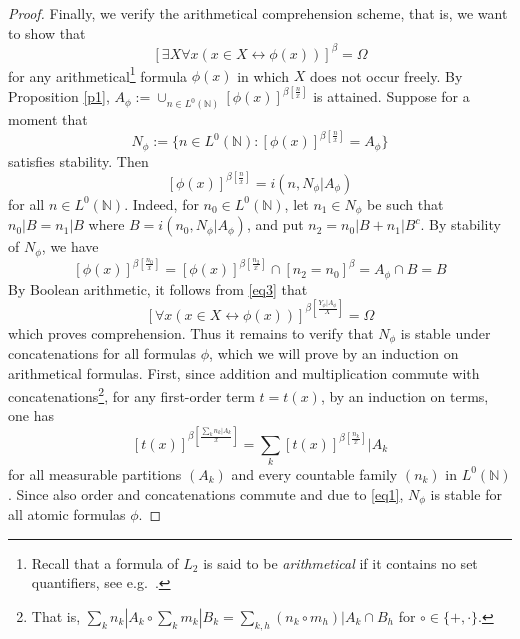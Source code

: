 \documentclass{jloganal}
\numberwithin{equation}{section}
\theoremstyle{plain}
\newcommand\N{\mathbb{N}}
\begin{document}
\begin{proof}
Finally, we verify the arithmetical comprehension scheme, that is, we want to show that 
\[
[\exists X \forall x (x\in X \leftrightarrow \phi(x))]^\beta=\Omega 
\]
for any arithmetical\footnote{Recall that a formula of $L_2$ is said to be \emph{arithmetical} if it contains no set quantifiers, see e.g.~\cite{simpson2009subsystems}.} formula $\phi(x)$ in which $X$ does not occur freely. 
By Proposition \ref{p1}, $A_\phi:=\cup_{n\in L^0(\N)} [\phi(x)]^{\beta[\frac{n}{x}]}$ is attained.  
Suppose for a moment that 
\[
N_\phi:=\{n\in L^0(\N)\colon [\phi(x)]^{\beta[\frac{n}{x}]}=A_\phi\}
\]
satisfies stability.  
Then 
\begin{equation}\label{eq3}
[\phi(x)]^{\beta[\frac{n}{x}]}=i(n,N_\phi|A_\phi)
\end{equation}
for all $n\in L^0(\N)$.  
Indeed, for $n_0\in L^0(\N)$, let $n_1\in N_\phi$ be such that $n_0|B=n_1|B$ where $B=i(n_0,N_\phi|A_\phi)$, and put $n_2=n_0|B+n_1|B^c$.  
By stability of $N_\phi$, we have 
\[
[\phi(x)]^{\beta[\frac{n_0}{x}]}=[\phi(x)]^{\beta[\frac{n_2}{x}]}\cap [n_2=n_0]^\beta=A_\phi\cap B=B
\] 
By Boolean arithmetic, it follows from \eqref{eq3} that 
\[
[\forall x (x\in X \leftrightarrow \phi(x))]^{\beta[\frac{Y_\phi|A_\phi}{X}]}=\Omega  
\]
which proves comprehension.  
Thus it remains to verify that $N_\phi$ is stable under concatenations for all formulas $\phi$, which we will prove by an induction on arithmetical formulas.  
First, since addition and multiplication commute with 
concatenations\footnote{That is, $\sum_k n_k|A_k\circ \sum_k m_k|B_k=\sum_{k,h} (n_k\circ m_h)|A_k\cap B_h$ for $\circ\in\{+,\cdot\}$.}, for any first-order term $t=t(x)$, by an induction on terms, one has
\[
[t(x)]^{\beta[\frac{\sum_k n_k|A_k}{x}]}=\sum_k [t(x)]^{\beta[\frac{n_k}{x}]}|A_k
\]
for all measurable partitions $(A_k)$ and every countable family $(n_k)$ in $L^0(\N)$.  
Since also order and concatenations commute and due to \eqref{eq1}, $N_\phi$ is stable for all atomic formulas $\phi$. 


\end{proof}
\end{document}
